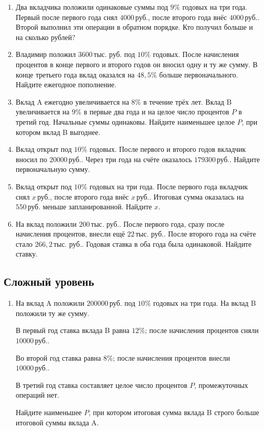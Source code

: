 \documentclass[a4paper,12pt]{article}
\newcommand{\rub}{\,\text{руб.}}
\newcommand{\thrub}{\,\text{тыс. руб.}}
\begin{document}
\begin{enumerate}[resume]
  \item Два вкладчика положили одинаковые суммы под \(9\%\) годовых
  на три года. Первый после первого года снял \(4000\rub\), после
  второго года внёс \(4000\rub\). Второй выполнил эти операции
  в обратном порядке. Кто получил больше и на сколько рублей?

  \item Владимир положил \(3600\thrub\) под \(10\%\) годовых.
  После начисления процентов в конце первого и второго годов он вносил
  одну и ту же сумму. В конце третьего года вклад оказался на
  \(48{,}5\%\) больше первоначального. Найдите ежегодное пополнение.

  \item Вклад A ежегодно увеличивается на \(8\%\) в течение трёх лет.
  Вклад B увеличивается на \(9\%\) в первые два года и на целое число
  процентов \(P\) в третий год. Начальные суммы одинаковы.
  Найдите наименьшее целое \(P\), при котором вклад B выгоднее.

  \item Вклад открыт под \(10\%\) годовых. После первого и второго
  годов вкладчик вносил по \(20000\rub\). Через три года на счёте
  оказалось \(179300\rub\). Найдите первоначальную сумму.

  \item Вклад открыт под \(10\%\) годовых на три года. После первого
  года вкладчик снял \(x\rub\), после второго года внёс \(x\rub\).
  Итоговая сумма оказалась на \(550\rub\) меньше запланированной.
  Найдите \(x\).

  \item На вклад положили \(200\thrub\). После первого года, сразу
  после начисления процентов, внесли ещё \(22\thrub\).
  После второго года на счёте стало \(266{,}2\thrub\).
  Годовая ставка в оба года была одинаковой. Найдите ставку.
\end{enumerate}

\subsection*{Сложный уровень}

\begin{enumerate}[resume]
  \item На вклад A положили \(200000\rub\) под \(10\%\) годовых
  на три года. На вклад B положили ту же сумму.

  В первый год ставка вклада B равна \(12\%\); после начисления
  процентов сняли \(10000\rub\).

  Во второй год ставка равна \(8\%\); после начисления процентов
  внесли \(10000\rub\).

  В третий год ставка составляет целое число процентов \(P\),
  промежуточных операций нет.

  Найдите наименьшее \(P\), при котором итоговая сумма вклада B
  строго больше итоговой суммы вклада A.
\end{enumerate}
\end{document}

